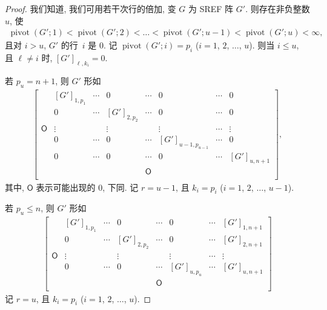 \documentclass[../libro.tex]{subfiles}
\begin{document}
\begin{proof}
    我们知道, 我们可用若干次行的倍加,
    变 \(G\) 为 SREF 阵 \(G'\).
    则存在非负整数 \(u\), 使
    \begin{align*}
        \operatorname{pivot} {(G'; 1)}
        < \operatorname{pivot} {(G'; 2)}
        < \dots
        < \operatorname{pivot} {(G'; u-1)}
        < \operatorname{pivot} {(G'; u)}
        < \infty,
    \end{align*}
    且对 \(i > u\),
    \(G'\) 的行~\(i\) 是 \(0\).
    记 \(\operatorname{pivot} {(G'; i)} = p_i\)
    (\(i = 1\), \(2\), \(\dots\), \(u\)).
    则当 \(i \leq u\),
    且 \(\ell \neq i\) 时,
    \([G']_{\ell,k_i} = 0\).

    若 \(p_u = n + 1\),
    则 \(G'\) 形如
    \begin{align*}
        \begin{bmatrix}
            {}         & [G']_{1,p_1} & \cdots & 0            & \cdots     & 0                  & \cdots & 0            \\
            {}         & 0            & \cdots & [G']_{2,p_2} & \cdots     & 0                  & \cdots & 0            \\
            \mathsf{O} & \vdots       & {}     & \vdots       & {}         & \vdots             & \cdots & \vdots       \\
            {}         & 0            & \cdots & 0            & \cdots     & [G']_{u-1,p_{u-1}} & \cdots & 0            \\
            {}         & 0            & \cdots & 0            & \cdots     & 0                  & \cdots & [G']_{u,n+1} \\
            {}         & {}           & {}     & {}           & \mathsf{O} & {}                 & {}     & {}           \\
        \end{bmatrix},
    \end{align*}
    其中, \(\mathsf{O}\) 表示可能出现的 \(0\), 下同.
    记 \(r = u - 1\),
    且 \(k_i = p_i\)
    (\(i = 1\), \(2\), \(\dots\), \(u - 1\)).

    若 \(p_u \leq n\),
    则 \(G'\) 形如
    \begin{align*}
        \begin{bmatrix}
            {}         & [G']_{1,p_1} & \cdots & 0            & \cdots     & 0            & \cdots & [G']_{1,n+1} \\
            {}         & 0            & \cdots & [G']_{2,p_2} & \cdots     & 0            & \cdots & [G']_{2,n+1} \\
            \mathsf{O} & \vdots       & {}     & \vdots       & {}         & \vdots       & \cdots & \vdots       \\
            {}         & 0            & \cdots & 0            & \cdots     & [G']_{u,p_u} & \cdots & [G']_{u,n+1} \\
            {}         & {}           & {}     & {}           & \mathsf{O} & {}           & {}     & {}           \\
        \end{bmatrix}
    \end{align*}
    记 \(r = u\),
    且 \(k_i = p_i\)
    (\(i = 1\), \(2\), \(\dots\), \(u\)).


\end{proof}
\end{document}
